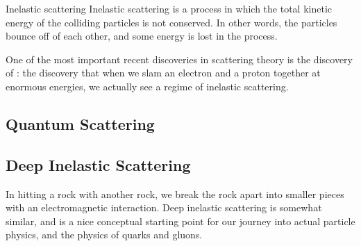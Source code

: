     \begin{definition}{Inelastic scattering}{}
        Inelastic scattering is a process in which the total kinetic energy of the colliding particles is not conserved.
        In other words, the particles bounce off of each other, and some energy is lost in the process.
    \end{definition}






    One of the most important recent discoveries in scattering theory is the discovery of :
    the discovery that when we slam an electron and a proton together at enormous energies, we actually see a regime of inelastic scattering.



\subsection{Quantum Scattering}


\subsection{Deep Inelastic Scattering}
In hitting a rock with another rock, we break the rock apart into smaller pieces with an electromagnetic interaction.
%
Deep inelastic scattering is somewhat similar, and is a nice conceptual starting point for our journey into actual particle physics, and the physics of quarks and gluons.

